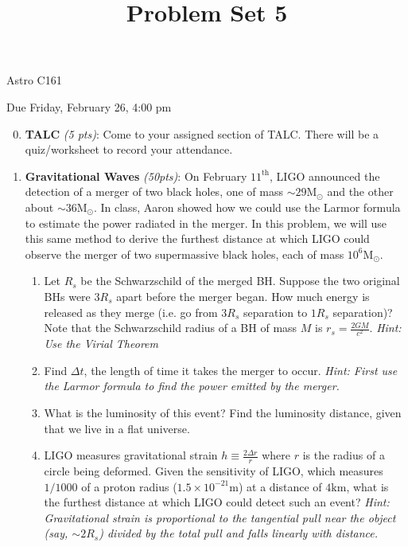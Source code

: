 \documentclass[12pt,preprint]{aastex}
\title{Problem Set 5}
\def\m{\mathrm{m}}
\def\km{\mathrm{km}}
\def\Msol{\mathrm{M_\odot}}
\newcommand\sn[2]{#1 \times 10^{#2}}
\def\rs{R_s}
\begin{document}
\maketitle
\centerline{Astro C161} 

\centerline{Due Friday, February 26, 4:00 pm}

\begin{enumerate}
\setcounter{enumi}{-1}

\item \textbf{TALC} \textit{(5 pts)}: Come to your assigned section of TALC. There will be a quiz/worksheet to record your attendance.

\item \textbf{Gravitational Waves} \textit{(50pts)}: 
	On February $11^{\mathrm{th}}$, LIGO announced the detection of a merger of two black holes, one of mass $\sim 29\Msol$ and the other about $\sim 36\Msol$. In class, Aaron showed how we could use the Larmor formula to estimate the power radiated in the merger. In this problem, we will use this same method to derive the furthest distance at which LIGO could observe the merger of two supermassive black holes, each of mass $10^6 \Msol$. 
	\begin{enumerate}
	\item Let $\rs$ be the Schwarzschild of the merged BH. Suppose the two original BHs were $3\rs$ apart before the merger began. How much energy is released as they merge (i.e. go from $3\rs$ separation to $1\rs$ separation)? Note that the Schwarzschild radius of a BH of mass $M$ is $r_s = \frac{2GM}{c^2}$. \textit{Hint: Use the Virial Theorem}
	\item Find $\Delta t$, the length of time it takes the merger to occur. \textit{Hint: First use the Larmor formula to find the power emitted by the merger.}
	\item What is the luminosity of this event? Find the luminosity distance, given that we live in a flat universe.
	\item LIGO measures gravitational strain $h \equiv \frac{2\Delta r}{r}$ where $r$ is the radius of a circle being deformed. Given the sensitivity of LIGO, which measures $1/1000$ of a proton radius ($\sn{1.5}{-21}\m$) at a distance of $4\km$, what is the furthest distance at which LIGO could detect such an event? \textit{Hint: Gravitational strain is proportional to the tangential pull near the object (say, $\sim 2\rs$) divided by the total pull and falls linearly with distance.}
	\end{enumerate}


\end{enumerate}
\end{document}
